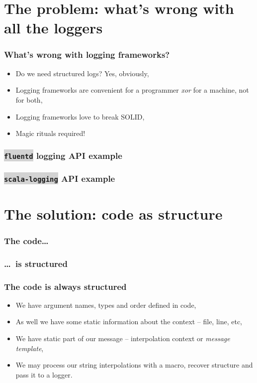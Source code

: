 \documentclass[usenames,dvipsnames]{beamer}
\newcommand{\code}[1]{\colorbox{lightgray}{\texttt{#1}}}
\begin{document}
\begin{frame}
\titlepage
\end{frame}

\section{The problem: what's wrong with all the loggers}

\begin{frame}
\frametitle{What's wrong with logging frameworks?}

\begin{itemize}
\item Do we need structured logs? Yes, obviously,
\item Logging frameworks are convenient for a programmer \textit{xor} for a machine, not for both,
\item Logging frameworks love to break SOLID,
\item Magic rituals required!
\end{itemize}
\end{frame}

\begin{frame}
\frametitle{\code{fluentd} logging API example}
\end{frame}

\begin{frame}
\frametitle{\code{scala-logging} API example}
\end{frame}

\section{The solution: code as structure}
\begin{frame}
\frametitle{The code\dots}
\end{frame}

\begin{frame}
\frametitle{\dots~is structured}
\end{frame}

\begin{frame}
\frametitle{The code is always structured}
\begin{itemize}
\item We have argument names, types and order defined in code,
\item As well we have some static information about the context -- file, line, etc,
\item We have static part of our message -- interpolation context or \textit{message template},
\item We may process our string interpolations with a macro, recover structure and pass it to a logger.
\end{itemize}
\end{frame}
\end{document}
